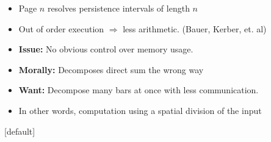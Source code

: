 \begin{frame}[fragile]
\begin{minipage}{.4\textwidth}
\end{minipage}
\begin{minipage}{.5\textwidth}
\hspace*{4in}
\begin{itemize}
\item Page $n$ resolves persistence intervals of length $n$
\item<2-> Out of order execution $\Rightarrow$ less arithmetic.  (Bauer, Kerber, et. al)
\item<3-> \textbf{Issue: } No obvious control over memory usage.
\item<4-> \textbf{Morally: } Decomposes direct sum the wrong way
\item<5-> \textbf{Want: } Decompose many bars at once with less communication.
\item<6-> In other words, computation using a spatial division of the input 
\end{itemize}
\end{minipage}
\end{frame}
[default]